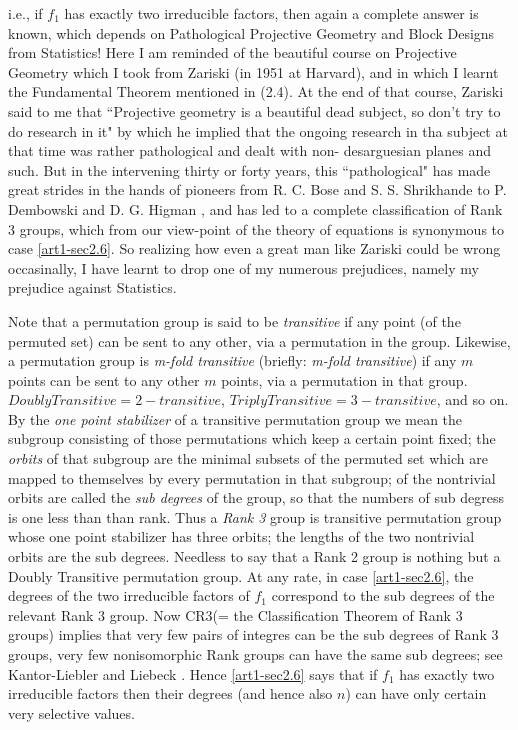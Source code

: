 i.e., if $f_{1}$ has exactly two irreducible factors, then again a complete answer is known, which depends on Pathological Projective Geometry and Block Designs from Statistics! Here I am reminded of the beautiful course on Projective Geometry which I took from Zariski (in 1951 at Harvard), and in which I learnt the Fundamental Theorem mentioned in (2.4). At the end of that course, Zariski said to me that ``Projective geometry is a beautiful dead subject, so don't try to do research in it" by which he implied that the ongoing research in tha subject at that time was rather pathological and dealt with non- desarguesian planes and such. But in the intervening thirty or forty years, this ``pathological" has made great strides in the hands of pioneers from R. C. Bose \cite{art1-key21} and S. S. Shrikhande \cite{art1-key58} to P. Dembowski \cite{art1-key29} and D. G. Higman \cite{art1-key34}, and has led to a complete classification of Rank 3 groups, which from our view-point of the theory of equations is synonymous to case \ref{art1-sec2.6}. So realizing how even a great man like Zariski could be wrong occasinally, I have learnt to drop one of my numerous prejudices, namely my prejudice against Statistics.  

Note that a permutation group is said to be {\it transitive} if any point (of the permuted set) can be sent to any other, via a permutation in the group. Likewise, a permutation group is {\it m-fold transitive} (briefly: {\it m-fold transitive}) if any $m$ points can be sent to any other $m$ points, via a permutation in that group. $Doubly Transitive = 2-transitive$, $Triply Transitive = 3-transitive$, and so on. By the {\it one point stabilizer} of a transitive permutation group we mean the subgroup consisting of those permutations which keep a certain point fixed; the {\it orbits} of that subgroup are the minimal subsets of the permuted set which are mapped to themselves by every permutation in that subgroup; of the nontrivial orbits are called the {\it sub degrees} of the group, so that the numbers of sub degress is one less than than rank. Thus a {\it Rank 3} group is transitive permutation group whose one point stabilizer has three orbits; the lengths of the two nontrivial orbits are the sub degrees. Needless to say that a Rank 2 group is nothing but a Doubly Transitive permutation group. At any rate, in case \ref{art1-sec2.6}, the degrees of the two irreducible factors of $f_{1}$ correspond to the sub degrees of the relevant Rank 3 group. Now CR3(= the Classification Theorem of Rank 3 groups) implies that very few pairs of integres can be the sub degrees  of Rank 3 groups, very few nonisomorphic Rank groups can have the same sub degrees; see Kantor-Liebler \cite{art1-key42} and Liebeck \cite{art1-key44}. Hence \ref{art1-sec2.6} says that if $f_{1}$ has exactly two irreducible factors then their degrees (and hence also $n$) can have only certain very selective values.

